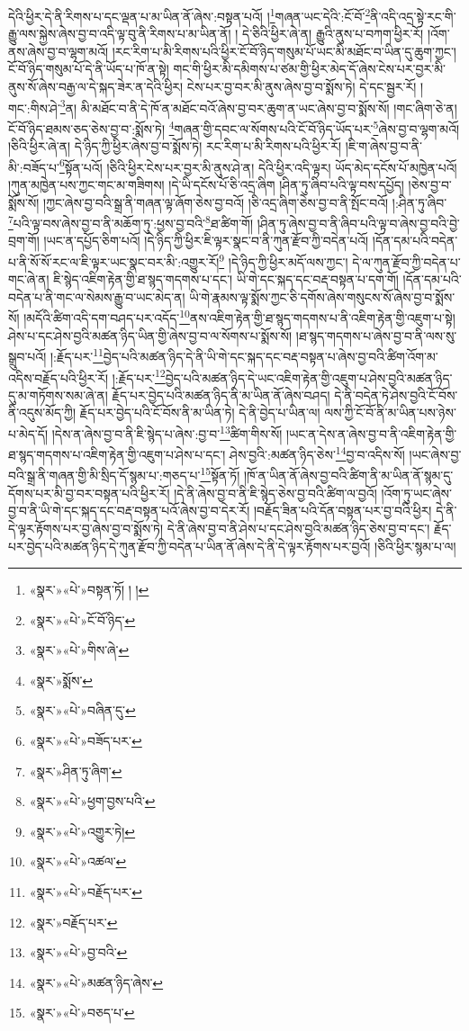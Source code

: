 དེའི་ཕྱིར་དེ་ནི་རིགས་པ་དང་ལྡན་པ་མ་ཡིན་ནོ་ཞེས་:བསྟན་པའོ། །\footnote{«སྣར་»«པེ་»བསྟན་ཏོ། ། །}གཞན་ཡང་དེའི་:ངོ་བོ་\footnote{«སྣར་»«པེ་»ངོ་བོ་ཉིད་}ནི་འདི་འདྲ་སྟེ་རང་གི་རྒྱུ་ལས་སྐྱེས་ཞེས་བྱ་བ་འདི་ལྟ་བུ་ནི་རིགས་པ་མ་ཡིན་ནོ། །
དེ་ཅིའི་ཕྱིར་ཞེ་ན། རྒྱུའི་ནུས་པ་བཀག་ཕྱིར་རོ། །འོག་ནས་ཞེས་བྱ་བ་ལྷག་མའོ། །རང་རིག་པ་མི་རིགས་པའི་ཕྱིར་ངོ་བོ་ཉིད་གསུམ་པོ་ཡང་མི་མཐོང་བ་ཡིན་དུ་ཆུག་ཀྱང་། ངོ་བོ་ཉིད་གསུམ་པོ་དེ་ནི་ཡོད་པ་ཁོ་ན་སྟེ། གང་གི་ཕྱིར་མི་དམིགས་པ་ཙམ་གྱི་ཕྱིར་མེད་དོ་ཞེས་ངེས་པར་བྱར་མི་ནུས་སོ་ཞེས་བརྒྱ་ལ་དེ་སྐད་ཟེར་ན་དེའི་ཕྱིར། ངེས་པར་བྱ་བར་མི་ནུས་ཞེས་བྱ་བ་སྨོས་ཏེ། དེ་དང་སྦྱར་རོ། །གང་:གིས་ཤེ་\footnote{«སྣར་»«པེ་»གིས་ཞེ་}ན། མི་མཐོང་བ་ནི་དེ་ཁོ་ན་མཐོང་བའོ་ཞེས་བྱ་བར་ཆུག་ན་ཡང་ཞེས་བྱ་བ་སྨོས་སོ། །གང་ཞིག་ཅེ་ན། ངོ་བོ་ཉིད་ཐམས་ཅད་ཅེས་བྱ་བ་:སྨོས་ཏེ། \footnote{«སྣར་»སྨོས་}གཞན་གྱི་དབང་ལ་སོགས་པའི་ངོ་བོ་ཉིད་ཡོད་པར་\footnote{«སྣར་»«པེ་»བཞིན་དུ་}ཞེས་བྱ་བ་ལྷག་མའོ། །ཅིའི་ཕྱིར་ཞེ་ན། དེ་ཉིད་ཀྱི་ཕྱིར་ཞེས་བྱ་བ་སྨོས་ཏེ། རང་རིག་པ་མི་རིགས་པའི་ཕྱིར་རོ། །ཇི་ག་ཞེས་བྱ་བ་ནི་མི་:བཟོད་པ་\footnote{«སྣར་»«པེ་»བཟོད་པར་}སྟོན་པའོ། །ཅིའི་ཕྱིར་ངེས་པར་བྱར་མི་ནུས་ཤེ་ན། དེའི་ཕྱིར་འདི་ལྟར། ཡོད་མེད་དངོས་པོ་མཁྱེན་པའོ། །ཀུན་མཁྱེན་པས་ཀྱང་གང་མ་གཟིགས། །དེ་ཡི་དངོས་པོ་ཅི་འདྲ་ཞིག །ཤིན་ཏུ་ཞིབ་པའི་ལྟ་བས་དཔྱོད། །ཅེས་བྱ་བ་སྨོས་སོ། །ཀྱང་ཞེས་བྱ་བའི་སྒྲ་ནི་གཞན་ལྟ་ཞོག་ཅེས་བྱ་བའོ། །ཅི་འདྲ་ཞིག་ཅེས་བྱ་བ་ནི་སྤོང་བའོ། །:ཤིན་ཏུ་ཞིབ་\footnote{«སྣར་»ཤིན་ཏུ་ཞིག་}པའི་ལྟ་བས་ཞེས་བྱ་བ་ནི་མཆོག་ཏུ་:ཕྱས་བྱ་བའི་\footnote{«སྣར་»«པེ་»ཕྱག་བྱས་པའི་}ཐ་ཚིག་གོ། །ཤིན་ཏུ་ཞེས་བྱ་བ་ནི་ཞིབ་པའི་ལྟ་བ་ཞེས་བྱ་བའི་བྱེ་བྲག་གོ། །ཡང་ན་དཔྱོད་ཅིག་པའོ། །དེ་ཉིད་ཀྱི་ཕྱིར་ཇི་ལྟར་སྣང་བ་ནི་ཀུན་རྫོབ་ཀྱི་བདེན་པའོ། །དོན་དམ་པའི་བདེན་པ་ནི་སོ་སོ་རང་ལ་ཇི་ལྟར་ཡང་སྣང་བར་མི་:འགྱུར་རོ།\footnote{«སྣར་»«པེ་»འགྱུར་ཏེ།} །དེ་ཉིད་ཀྱི་ཕྱིར་མདོ་ལས་ཀྱང་། དེ་ལ་ཀུན་རྫོབ་ཀྱི་བདེན་པ་གང་ཞེ་ན། ཇི་སྙེད་འཇིག་རྟེན་གྱི་ཐ་སྙད་གདགས་པ་དང་། ཡི་གེ་དང་སྐད་དང་བརྡ་བསྟན་པ་དག་གོ། །དོན་དམ་པའི་བདེན་པ་ནི་གང་ལ་སེམས་རྒྱུ་བ་ཡང་མེད་ན། ཡི་གེ་རྣམས་ལྟ་སྨོས་ཀྱང་ཅི་དགོས་ཞེས་གསུངས་སོ་ཞེས་བྱ་བ་སྨོས་སོ། །མདོའི་ཚིག་འདི་དག་བཤད་པར་འདོད་\footnote{«སྣར་»«པེ་»འཚལ་}ནས་འཇིག་རྟེན་གྱི་ཐ་སྙད་གདགས་པ་ནི་འཇིག་རྟེན་གྱི་འཇུག་པ་སྟེ། ཤེས་པ་དང་ཤེས་བྱའི་མཚན་ཉིད་ཡིན་གྱི་ཞེས་བྱ་བ་ལ་སོགས་པ་སྨོས་སོ། །ཐ་སྙད་གདགས་པ་ཞེས་བྱ་བ་ནི་ལས་སུ་སྒྲུབ་པའོ། །:རྗོད་པར་\footnote{«སྣར་»«པེ་»བརྗོད་པར་}བྱེད་པའི་མཚན་ཉིད་དེ་ནི་ཡི་གེ་དང་སྐད་དང་བརྡ་བསྟན་པ་ཞེས་བྱ་བའི་ཚིག་འོག་མ་འདིས་བརྗོད་པའི་ཕྱིར་རོ། །:རྗོད་པར་\footnote{«སྣར་»བརྗོད་པར་}བྱེད་པའི་མཚན་ཉིད་དེ་ཡང་འཇིག་རྟེན་གྱི་འཇུག་པ་ཤེས་བྱའི་མཚན་ཉིད་དུ་མ་གཏོགས་སམ་ཞེ་ན། རྗོད་པར་བྱེད་པའི་མཚན་ཉིད་ནི་མ་ཡིན་ནོ་ཞེས་བཤད། དེ་ནི་བདེན་ཏེ་ཤེས་བྱའི་ངོ་བོས་ནི་འདུས་མོད་ཀྱི། རྗོད་པར་བྱེད་པའི་ངོ་བོས་ནི་མ་ཡིན་ཏེ། དེ་ནི་བྱེད་པ་ཡིན་ལ། ལས་ཀྱི་ངོ་བོ་ནི་མ་ཡིན་པས་ཉེས་པ་མེད་དོ། །དེས་ན་ཞེས་བྱ་བ་ནི་ཇི་སྙེད་པ་ཞེས་:བྱ་བ་\footnote{«སྣར་»«པེ་»བྱ་བའི་}ཚིག་གིས་སོ། །ཡང་ན་དེས་ན་ཞེས་བྱ་བ་ནི་འཇིག་རྟེན་གྱི་ཐ་སྙད་གདགས་པ་འཇིག་རྟེན་གྱི་འཇུག་པ་ཤེས་པ་དང་། ཤེས་བྱའི་:མཚན་ཉིད་ཅེས་\footnote{«སྣར་»«པེ་»མཚན་ཉིད་ཞེས་}བྱ་བ་འདིས་སོ། །ཡང་ཞེས་བྱ་བའི་སྒྲ་ནི་གཞན་གྱི་མི་སྲིད་དོ་སྙམ་པ་:གཅད་པ་\footnote{«སྣར་»«པེ་»བཅད་པ་}སྟོན་ཏོ། །ཁོ་ན་ཡིན་ནོ་ཞེས་བྱ་བའི་ཚིག་ནི་མ་ཡིན་ནོ་སྙམ་དུ་དོགས་པར་མི་བྱ་བར་བསྟན་པའི་ཕྱིར་རོ། །དེ་ནི་ཞེས་བྱ་བ་ནི་ཇི་སྙེད་ཅེས་བྱ་བའི་ཚིག་ལ་བྱའོ། །འོག་ཏུ་ཡང་ཞེས་བྱ་བ་ནི་ཡི་གེ་དང་སྐད་དང་བརྡ་བསྟན་པའོ་ཞེས་བྱ་བ་དེར་རོ། །བརྗོད་ཟིན་པའི་དོན་བསྟན་པར་བྱ་བའི་ཕྱིར། དེ་ནི་དེ་ལྟར་རྟོགས་པར་བྱ་ཞེས་བྱ་བ་སྨོས་ཏེ། དེ་ནི་ཞེས་བྱ་བ་ནི་ཤེས་པ་དང་ཤེས་བྱའི་མཚན་ཉིད་ཅེས་བྱ་བ་དང་། རྗོད་པར་བྱེད་པའི་མཚན་ཉིད་དེ་ཀུན་རྫོབ་ཀྱི་བདེན་པ་ཡིན་ནོ་ཞེས་དེ་ནི་དེ་ལྟར་རྟོགས་པར་བྱའོ། །ཅིའི་ཕྱིར་སྙམ་པ་ལ། 